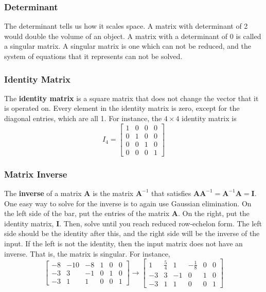 \documentclass[10pt]{beamer}
\begin{document}
\begin{frame}
  \frametitle{Determinant}
  The determinant tells us how it scales space. A matrix with determinant of 2 would double the volume of an object. A matrix with a determinant of 0 is called a singular matrix. A singular matrix is one which can not be reduced, and the system of equations that it represents can not be solved.
\end{frame}

\begin{frame}
  \frametitle{Identity Matrix}
  The \textbf{identity matrix} is a square matrix that does not change the vector that it is operated on. Every element in the identity matrix is zero, except for the diagonal entries, which are all 1. For instance, the $4\times 4$ identity matrix is
  $$I_4 = \left[\begin{matrix}
      1 & 0 & 0 & 0\\
      0 & 1 & 0 & 0\\
      0 & 0 & 1 & 0\\
      0 & 0 & 0 & 1
    \end{matrix}\right]$$
\end{frame}

\begin{frame}
  \frametitle{Matrix Inverse}
  The \textbf{inverse} of a matrix $\mathbf{A}$ is the matrix $\mathbf{A}^{-1}$ that satisfies $\mathbf{AA}^{-1} = \mathbf{A}^{-1}\mathbf{A} = \mathbf{I}$. One easy way to solve for the inverse is to again use Gaussian elimination. On the left side of the bar, put the entries of the matrix $\mathbf{A}$. On the right, put the identity matrix, $\mathbf{I}$. Then, solve until you reach reduced row-echelon form. The left side should be the identity after this, and the right side will be the inverse of the input. If the left is not the identity, then the input matrix does not have an inverse. That is, the matrix is singular. For instance,
  $$\left[\begin{array}{ccc|ccc}
      -8 & -10 & -8 & 1 & 0 & 0\\
      -3 & 3 & -1 & 0 & 1 & 0\\
      -3 & 1 & 1 & 0 & 0 & 1
    \end{array}\right] \rightarrow \left[\begin{array}{ccc|ccc}
      1 & \frac{5}{4} & 1 & -\frac{1}{8} & 0 & 0\\
      -3 & 3 & -1 & 0 & 1 & 0\\
      -3 & 1 & 1 & 0 & 0 & 1
    \end{array}\right]$$
\end{frame}
\end{document}
